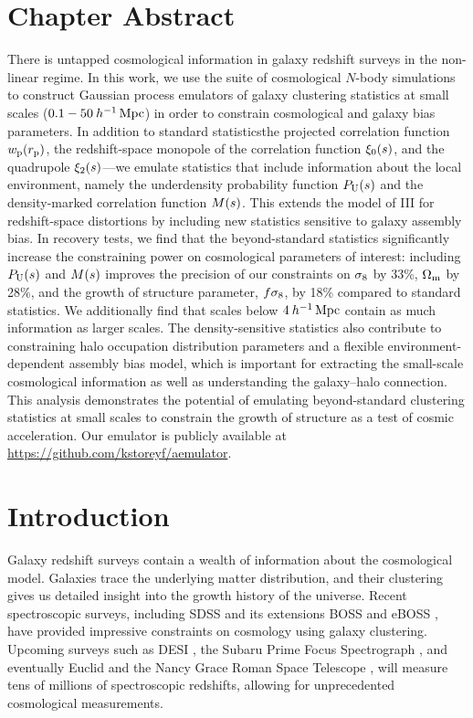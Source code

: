 \section{Chapter Abstract}
There is untapped cosmological information in galaxy redshift surveys in the non-linear regime.
In this work, we use the \aemulus suite of cosmological $N$-body simulations to construct Gaussian process emulators of galaxy clustering statistics at small scales ($0.1-50 \: h^{-1}\,\mathrm{Mpc}$) in order to constrain cosmological and galaxy bias parameters.
In addition to standard statistics{\emdash}the projected correlation function $w_\mathrm{p}(r_\mathrm{p})$, the redshift-space monopole of the correlation function $\xi_0(s)$, and the quadrupole $\xi_2(s)$---we emulate statistics that include information about the local environment, namely the underdensity probability function $P_\mathrm{U}(s)$ and the density-marked correlation function $M(s)$.
This extends the model of \aemulus III for redshift-space distortions by including new statistics sensitive to galaxy assembly bias.
In recovery tests, we find that the beyond-standard statistics significantly increase the constraining power on cosmological parameters of interest: including $P_\mathrm{U}(s)$ and $M(s)$ improves the precision of our constraints on $\sigma_\mathrm{8}$ by 33\%, $\Omega_\mathrm{m}$ by 28\%, and the growth of structure parameter, $f\sigma_8 $, by 18\% compared to standard statistics.
We additionally find that scales below $4 \: h^{-1}\,\mathrm{Mpc}$ contain as much information as larger scales.
The density-sensitive statistics also contribute to constraining halo occupation distribution parameters and a flexible environment-dependent assembly bias model, which is important for extracting the small-scale cosmological information as well as understanding the galaxy--halo connection.
This analysis demonstrates the potential of emulating beyond-standard clustering statistics at small scales to constrain the growth of structure as a test of cosmic acceleration.
Our emulator is publicly available at \url{https://github.com/kstoreyf/aemulator}.



\section{Introduction}

Galaxy redshift surveys contain a wealth of information about the cosmological model.
Galaxies trace the underlying matter distribution, and their clustering gives us detailed insight into the growth history of the universe.
Recent spectroscopic surveys, including SDSS \citep{York2000} and its extensions BOSS \citep{Dawson2013} and eBOSS \citep{Dawson2015}, have provided impressive constraints on cosmology using galaxy clustering.
Upcoming surveys such as DESI \citep{Aghamousa2016}, the Subaru Prime Focus Spectrograph \citep{takada_extragalactic_2014}, and eventually Euclid \citep{Laureijs2011} and the Nancy Grace Roman Space Telescope \citep{Green2012}, will measure tens of millions of spectroscopic redshifts, allowing for unprecedented cosmological measurements.

